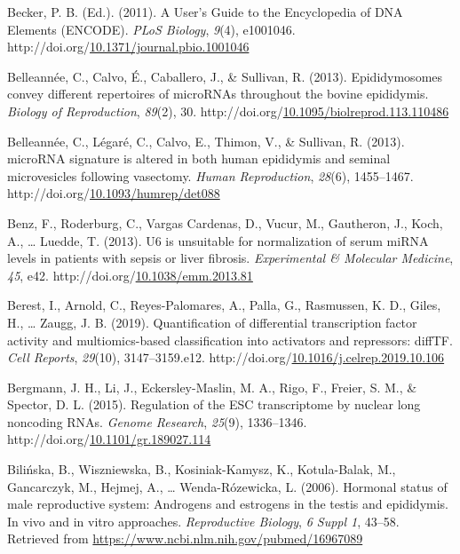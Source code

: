 \documentclass[12pt,twoside]{reedthesis}
\newlength{\cslhangindent}
\newenvironment{CSLReferences}[2] %
 {%
  \setlength{\parindent}{0pt}
  \ifodd #1 \everypar{\setlength{\hangindent}{\cslhangindent}}\ignorespaces\fi
  \ifnum #2 > 0
  \setlength{\parskip}{#2\baselineskip}
  \fi
 }%
 {}
\begin{document}
\begin{CSLReferences}{1}{0}
\leavevmode{}%
Becker, P. B. (Ed.). (2011). A User's Guide to the Encyclopedia of DNA Elements (ENCODE). \emph{PLoS Biology}, \emph{9}(4), e1001046. http://doi.org/\href{https://doi.org/10.1371/journal.pbio.1001046}{10.1371/journal.pbio.1001046}

\leavevmode{}%
Belleannée, C., Calvo, É., Caballero, J., \& Sullivan, R. (2013). Epididymosomes convey different repertoires of {microRNAs} throughout the bovine epididymis. \emph{Biology of Reproduction}, \emph{89}(2), 30. http://doi.org/\href{https://doi.org/10.1095/biolreprod.113.110486}{10.1095/biolreprod.113.110486}

\leavevmode{}%
Belleannée, C., Légaré, C., Calvo, E., Thimon, V., \& Sullivan, R. (2013). {microRNA} signature is altered in both human epididymis and seminal microvesicles following vasectomy. \emph{Human Reproduction}, \emph{28}(6), 1455--1467. http://doi.org/\href{https://doi.org/10.1093/humrep/det088}{10.1093/humrep/det088}

\leavevmode{}%
Benz, F., Roderburg, C., Vargas Cardenas, D., Vucur, M., Gautheron, J., Koch, A., \ldots{} Luedde, T. (2013). U6 is unsuitable for normalization of serum miRNA levels in patients with sepsis or liver fibrosis. \emph{Experimental \& Molecular Medicine}, \emph{45}, e42. http://doi.org/\href{https://doi.org/10.1038/emm.2013.81}{10.1038/emm.2013.81}

\leavevmode{}%
Berest, I., Arnold, C., Reyes-Palomares, A., Palla, G., Rasmussen, K. D., Giles, H., \ldots{} Zaugg, J. B. (2019). Quantification of differential transcription factor activity and multiomics-based classification into activators and repressors: diffTF. \emph{Cell Reports}, \emph{29}(10), 3147--3159.e12. http://doi.org/\href{https://doi.org/10.1016/j.celrep.2019.10.106}{10.1016/j.celrep.2019.10.106}

\leavevmode{}%
Bergmann, J. H., Li, J., Eckersley-Maslin, M. A., Rigo, F., Freier, S. M., \& Spector, D. L. (2015). Regulation of the ESC transcriptome by nuclear long noncoding RNAs. \emph{Genome Research}, \emph{25}(9), 1336--1346. http://doi.org/\href{https://doi.org/10.1101/gr.189027.114}{10.1101/gr.189027.114}

\leavevmode{}%
Bilińska, B., Wiszniewska, B., Kosiniak-Kamysz, K., Kotula-Balak, M., Gancarczyk, M., Hejmej, A., \ldots{} Wenda-Rózewicka, L. (2006). Hormonal status of male reproductive system: Androgens and estrogens in the testis and epididymis. In vivo and in vitro approaches. \emph{Reproductive Biology}, \emph{6 Suppl 1}, 43--58. Retrieved from \url{https://www.ncbi.nlm.nih.gov/pubmed/16967089}


\end{CSLReferences}
\end{document}
